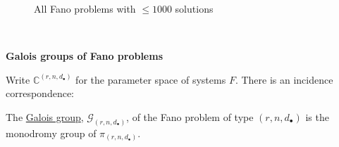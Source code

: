 \documentclass[final]{beamer}
\theoremstyle{thrm}
\newcommand{\blue}[1]{{\color{black!15!aggiemaroon}\underline{#1}}}
\newcommand{\headft}[1]{
\begin{center}
{\color{aggiemaroon}\textbf{\quad\LARGE{#1}\quad}}
\end{center}
}
\newcommand{\tallminipage}{\begin{minipage}{.025\textwidth}~\vspace{0pt}~\end{minipage}}
\begin{document}
\begin{frame}
\begin{minipage}[t]{.3\textwidth}
\begin{figure}
\vspace{.2cm}

All Fano problems with $\le 1000$ solutions
\end{figure}
\end{minipage}
%
\tallminipage
\begin{minipage}[t]{.3\textwidth}
\headft{Galois groups of Fano problems}
Write $\mathbb{C}^{(r,n,d_\bullet)}$ for the parameter space of systems $F$. There is an incidence correspondence:

\vspace{-1cm}

\begin{center}
\end{center}




\vspace{-.1cm}


%
%
The \blue{Galois group}, $\mathcal{G}_{(r,n,d_\bullet)}$, of the Fano problem of type $(r,n,d_\bullet)$ is the monodromy group of $\pi_{(r,n,d_\bullet)}$.


\end{minipage}
\end{frame}
\end{document}
